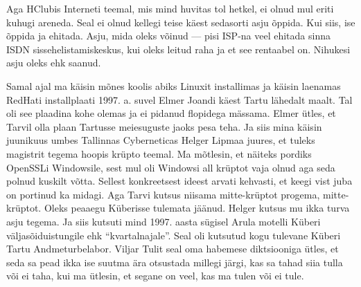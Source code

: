 Aga HClubis Interneti teemal, mis mind huvitas tol hetkel, ei olnud mul eriti kuhugi areneda. Seal ei olnud kellegi teise käest sedasorti asju õppida. Kui siis, ise õppida ja ehitada. Asju, mida oleks võinud --- pisi ISP-na veel ehitada sinna ISDN sissehelistamiskeskus, kui oleks leitud raha ja et see rentaabel on. Nihukesi asju oleks ehk saanud. 

Samal ajal ma käisin mõnes koolis abiks Linuxit installimas ja käisin laenamas RedHati installplaati 1997. a. suvel Elmer Joandi käest Tartu lähedalt maalt. Tal oli see plaadina kohe olemas ja ei pidanud flopidega mässama. Elmer ütles, et Tarvil olla plaan Tartusse meiesuguste jaoks pesa teha. Ja siis mina käisin juunikuus umbes Tallinnas Cyberneticas Helger Lipmaa  juures, et tuleks magistrit tegema hoopis krüpto teemal. Ma mõtlesin, et näiteks pordiks OpenSSLi Windowsile, sest mul oli Windowsi all krüptot vaja olnud aga seda polnud kuskilt võtta. Sellest konkreetsest ideest arvati kehvasti, et keegi vist juba on portinud ka midagi. Aga Tarvi kutsus niisama mitte-krüptot progema, mitte-krüptot. Oleks peaaegu Küberisse tulemata jäänud. Helger kutsus mu ikka turva asju tegema. Ja siis kutsuti mind 1997. aasta sügisel Arula motelli Küberi väljasõiduistungile ehk \enquote{kvartalnajale}. Seal oli kutsutud kogu tulevane Küberi Tartu Andmeturbelabor. Viljar Tulit seal oma habemese diktsiooniga ütles, et seda sa pead ikka ise suutma ära otsustada millegi järgi, kas sa tahad siia tulla või ei taha, kui ma ütlesin, et segane on veel, kas ma tulen või ei tule.

